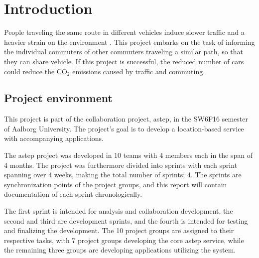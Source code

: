 \chapter{Introduction}\label{ch:introduction}


People traveling the same route in different vehicles induce slower traffic and a heavier strain on the environment \cite{trafficJam}\cite{trafficEmissions}.
This project embarks on the task of informing the individual commuters of other commuters traveling a similar path, so that they can share vehicle.
If this project is successful, the reduced number of cars could reduce the CO$_2$ emissions caused by traffic and commuting.

\section{Project environment}
This project is part of the collaboration project, \gls{astep}, in the SW6F16 semester of Aalborg University.
The project's goal is to develop a location-based service with accompanying applications. 

The \gls{astep} project was developed in 10 teams with 4 members each in the span of 4 months.
The project was furthermore divided into sprints with each sprint spanning over 4 weeks, making the total number of sprints; 4.
The sprints are synchronization points of the project groups, and this report will contain documentation of each sprint chronologically.

The first sprint is intended for analysis and collaboration development, the second and third are development sprints, and the fourth is intended for testing and finalizing the development.
The 10 project groups are assigned to their respective tasks, with 7 project groups developing the core \gls{astep} service, while the remaining three groups are developing applications utilizing the system.




